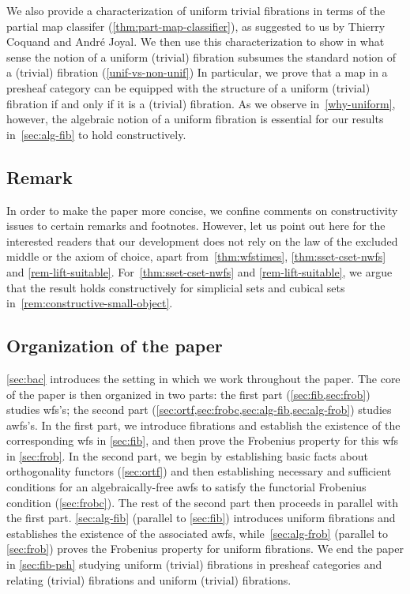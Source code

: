 \documentclass[reqno,10pt,a4paper,oneside,draft]{amsart}
\begin{document}
We also provide a characterization of uniform trivial fibrations in terms of the partial map classifer 
(\cref{thm:part-map-classifier}), as suggested to us by Thierry Coquand and Andr\'e Joyal.
We then use this characterization to show in what sense the notion of a uniform (trivial) fibration subsumes the standard notion of a (trivial) fibration (\cref{unif-vs-non-unif}) In particular, we prove that a map in a presheaf category can be equipped with the structure of a uniform (trivial) fibration if and only if it is a (trivial) fibration.
As we observe in~\cref{why-uniform}, however, the algebraic notion of a uniform fibration is essential for our results in~\cref{sec:alg-fib} to hold constructively.

\subsection*{Remark}
In order to make the paper more concise, we confine comments on constructivity issues to certain remarks and footnotes.
However, let us point out here for the interested readers that our development does not rely on the law of the excluded middle or the axiom of choice, apart from~\cref{thm:wfstimes}, \cref{thm:sset-cset-nwfs} and \cref{rem-lift-suitable}.
For~\cref{thm:sset-cset-nwfs} and \cref{rem-lift-suitable}, we argue that the result holds constructively for simplicial sets and cubical sets  in~\cref{rem:constructive-small-object}.%

\subsection*{Organization of the paper} \cref{sec:bac} introduces the setting in which we work throughout the paper.
The core of the paper is then organized in two parts: the first part (\cref{sec:fib,sec:frob}) studies wfs's; the second part (\cref{sec:ortf,sec:frobc,sec:alg-fib,sec:alg-frob}) studies awfs's.
In the first part, we introduce fibrations and establish the existence of the corresponding wfs in \cref{sec:fib}, and then prove the Frobenius property for this wfs in \cref{sec:frob}.
In the second part, we begin by establishing basic facts about orthogonality functors (\cref{sec:ortf}) and then establishing necessary and sufficient conditions for an algebraically-free awfs to satisfy the functorial Frobenius condition (\cref{sec:frobc}).
The rest of the second part then proceeds in parallel with the first part.
\cref{sec:alg-fib} (parallel to \cref{sec:fib}) introduces uniform fibrations and establishes the existence of the associated awfs, while~\cref{sec:alg-frob} (parallel to \cref{sec:frob}) proves the Frobenius property for uniform fibrations.
We end the paper in \cref{sec:fib-psh} studying uniform (trivial) fibrations in presheaf categories and relating (trivial) fibrations and uniform (trivial) fibrations.
\end{document}
